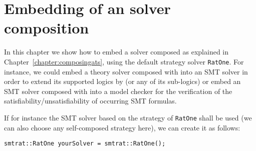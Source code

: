 \chapter{Embedding of an \smtrat solver composition}
\label{chapter:embedding}
In this chapter we show how to embed a solver composed as explained
in Chapter~\ref{chapter:composingats}, \eg using the default strategy
solver \texttt{RatOne}. For instance, we could embed a theory solver composed with \smtrat 
into an SMT solver in order to extend its supported logics by \supportedLogics (or any of its sub-logics) 
or embed an SMT solver composed with \smtrat into a model checker for the verification of the 
satisfiability/unsatisfiability of occurring SMT formulas. 

If for instance the SMT solver based on the strategy of \texttt{RatOne} shall be used (we can also choose any self-composed strategy here), we can create it as follows:
\begin{verbatim}
smtrat::RatOne yourSolver = smtrat::RatOne();
\end{verbatim}

